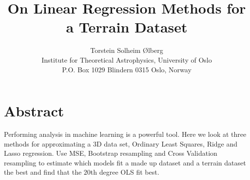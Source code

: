 \documentclass[11pt, A4paper, english]{article}
\author{
Torstein Solheim Ølberg \\
Institute for Theoretical Astrophysics, University of Oslo \\
P.O. Box 1029 Blindern 0315 Oslo, Norway
}
\title{On Linear Regression Methods for a Terrain Dataset}
\begin{document}
	
\maketitle
\tableofcontents
\clearpage
	
	\section{Abstract}
Performing analysis in machine learning is a powerful tool. Here we look at three methods for approximating a 3D data set, Ordinary Least Squares, Ridge and Lasso regression. Use MSE, Bootstrap resampling and Cross Validation resampling to estimate which models fit a made up dataset and a terrain dataset the best and find that the $20$th degree OLS fit best.
	
\end{document}
